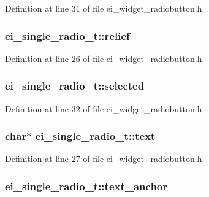 Definition at line 31 of file ei\-\_\-widget\-\_\-radiobutton.\-h.

\hypertarget{structei__single__radio__t_a6a4c4ec006330cc8a5a5f66b5902d73b}{
\subsubsection[{relief}]{ ei\-\_\-single\-\_\-radio\-\_\-t\-::relief}}\label{structei__single__radio__t_a6a4c4ec006330cc8a5a5f66b5902d73b}


Definition at line 26 of file ei\-\_\-widget\-\_\-radiobutton.\-h.

\hypertarget{structei__single__radio__t_a93972e22a3c6f484583b1187c0a2c2b9}{
\subsubsection[{selected}]{ ei\-\_\-single\-\_\-radio\-\_\-t\-::selected}}\label{structei__single__radio__t_a93972e22a3c6f484583b1187c0a2c2b9}


Definition at line 32 of file ei\-\_\-widget\-\_\-radiobutton.\-h.

\hypertarget{structei__single__radio__t_ad4802114cca4e3b872e8be371bc10b16}{
\subsubsection[{text}]{\setlength{\rightskip}{0pt plus 5cm}char$\ast$ ei\-\_\-single\-\_\-radio\-\_\-t\-::text}}\label{structei__single__radio__t_ad4802114cca4e3b872e8be371bc10b16}


Definition at line 27 of file ei\-\_\-widget\-\_\-radiobutton.\-h.

\hypertarget{structei__single__radio__t_a78abf8d0b50aa886fdb07e9aa3ba0974}{
\subsubsection[{text\-\_\-anchor}]{ ei\-\_\-single\-\_\-radio\-\_\-t\-::text\-\_\-anchor}}\label{structei__single__radio__t_a78abf8d0b50aa886fdb07e9aa3ba0974}


